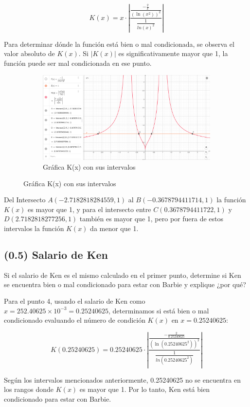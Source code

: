 \[ K(x) = x \cdot \left| \frac{\frac{-\frac{2}{x}}{(\ln(x^2))^2}}{\frac{1}{ln(x)^2}} \right| \]

Para determinar dónde la función está bien o mal condicionada, se observa el valor absoluto de \( K(x) \). Si \( |K(x)| \) es significativamente mayor que 1, la función puede ser mal condicionada en ese punto.

\begin{figure}[H]
    \centering
    \begin{subfigure}[b]{\textwidth}
        \centering
        \includegraphics[width=\textwidth]{Figures/0. General/1.3.png}
        \caption{Gráfica K(x) con sus intervalos}
        \label{fig: Grafica K(x)}
    \end{subfigure}
\end{figure}

Del Intersecto $A (-2.7182818284559, 1)$ al $B (-0.3678794411714, 1)$ la función $K(x)$
es mayor que 1, y para el intersecto entre $C (0.3678794411722, 1)$ y
$D (2.7182818277256, 1)$ también es mayor que 1, pero por fuera de estos
intervalos la función $K(x)$ da menor que 1.

\subsection{(0.5) Salario de Ken}

Si el salario de Ken es el mismo calculado en el primer punto, determine si Ken se encuentra bien o mal condicionado para estar con Barbie y explique ¿por qué?

Para el punto 4, usando el salario de Ken como \( x = 252.40625 \times 10^{-3} = 0.25240625 \), determinamos si está bien o mal condicionado evaluando el número de condición \( K(x) \) en \( x = 0.25240625 \):

\[ K(0.25240625) = 0.25240625 \cdot \left| \frac{\frac{-\frac{2}{0.25240625}}{(\ln(0.25240625^2))^2}}{\frac{1}{ln(0.25240625^2)}} \right| \]

Según los intervalos mencionados anteriormente, 0.25240625 no se encuentra en los rangos donde \( K(x) \) es mayor que 1. Por lo tanto, Ken está bien condicionado para estar con Barbie.
